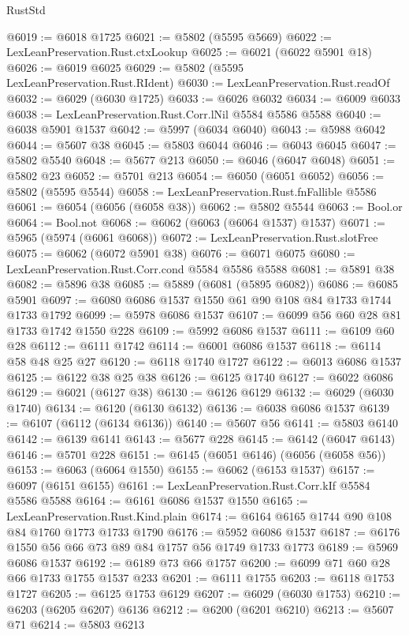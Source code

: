 \begin{lexlean}{RustStd}
\begin{coremodule}
@6019 := @6018 @1725
@6021 := @5802 (@5595 @5669)
@6022 := LexLeanPreservation.Rust.ctxLookup
@6025 := @6021 (@6022 @5901 @18)
@6026 := @6019 @6025
@6029 := @5802 (@5595 LexLeanPreservation.Rust.RIdent)
@6030 := LexLeanPreservation.Rust.readOf
@6032 := @6029 (@6030 @1725)
@6033 := @6026 @6032
@6034 := @6009 @6033
@6038 := LexLeanPreservation.Rust.Corr.lNil @5584 @5586 @5588
@6040 := @6038 @5901 @1537
@6042 := @5997 (@6034 @6040)
@6043 := @5988 @6042
@6044 := @5607 @38
@6045 := @5803 @6044
@6046 := @6043 @6045
@6047 := @5802 @5540
@6048 := @5677 @213
@6050 := @6046 (@6047 @6048)
@6051 := @5802 @23
@6052 := @5701 @213
@6054 := @6050 (@6051 @6052)
@6056 := @5802 (@5595 @5544)
@6058 := LexLeanPreservation.Rust.fnFallible @5586
@6061 := @6054 (@6056 (@6058 @38))
@6062 := @5802 @5544
@6063 := Bool.or
@6064 := Bool.not
@6068 := @6062 (@6063 (@6064 @1537) @1537)
@6071 := @5965 (@5974 (@6061 @6068))
@6072 := LexLeanPreservation.Rust.slotFree
@6075 := @6062 (@6072 @5901 @38)
@6076 := @6071 @6075
@6080 := LexLeanPreservation.Rust.Corr.cond @5584 @5586 @5588
@6081 := @5891 @38
@6082 := @5896 @38
@6085 := @5889 (@6081 (@5895 @6082))
@6086 := @6085 @5901
@6097 := @6080 @6086 @1537 @1550 @61 @90 @108 @84 @1733 @1744 @1733 @1792
@6099 := @5978 @6086 @1537
@6107 := @6099 @56 @60 @28 @81 @1733 @1742 @1550 @228
@6109 := @5992 @6086 @1537
@6111 := @6109 @60 @28
@6112 := @6111 @1742
@6114 := @6001 @6086 @1537
@6118 := @6114 @58 @48 @25 @27
@6120 := @6118 @1740 @1727
@6122 := @6013 @6086 @1537
@6125 := @6122 @38 @25 @38
@6126 := @6125 @1740
@6127 := @6022 @6086
@6129 := @6021 (@6127 @38)
@6130 := @6126 @6129
@6132 := @6029 (@6030 @1740)
@6134 := @6120 (@6130 @6132)
@6136 := @6038 @6086 @1537
@6139 := @6107 (@6112 (@6134 @6136))
@6140 := @5607 @56
@6141 := @5803 @6140
@6142 := @6139 @6141
@6143 := @5677 @228
@6145 := @6142 (@6047 @6143)
@6146 := @5701 @228
@6151 := @6145 (@6051 @6146) (@6056 (@6058 @56))
@6153 := @6063 (@6064 @1550)
@6155 := @6062 (@6153 @1537)
@6157 := @6097 (@6151 @6155)
@6161 := LexLeanPreservation.Rust.Corr.kIf @5584 @5586 @5588
@6164 := @6161 @6086 @1537 @1550
@6165 := LexLeanPreservation.Rust.Kind.plain
@6174 := @6164 @6165 @1744 @90 @108 @84 @1760 @1773 @1733 @1790
@6176 := @5952 @6086 @1537
@6187 := @6176 @1550 @56 @66 @73 @89 @84 @1757 @56 @1749 @1733 @1773
@6189 := @5969 @6086 @1537
@6192 := @6189 @73 @66 @1757
@6200 := @6099 @71 @60 @28 @66 @1733 @1755 @1537 @233
@6201 := @6111 @1755
@6203 := @6118 @1753 @1727
@6205 := @6125 @1753 @6129
@6207 := @6029 (@6030 @1753)
@6210 := @6203 (@6205 @6207) @6136
@6212 := @6200 (@6201 @6210)
@6213 := @5607 @71
@6214 := @5803 @6213

\end{coremodule}
\end{lexlean}
